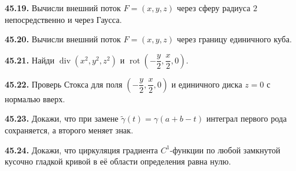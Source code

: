 \noindent\begin{minipage}[t]{\linewidth}\textbf{45.19.} Вычисли внешний поток \(F=(x,y,z)\) через сферу радиуса \(2\) непосредственно и через Гаусса.\par\end{minipage}\par
\noindent\begin{minipage}[t]{\linewidth}\textbf{45.20.} Вычисли внешний поток \(F=(x,y,z)\) через границу единичного куба.\par\end{minipage}\par
\noindent\begin{minipage}[t]{\linewidth}\textbf{45.21.} Найди \(\operatorname{div}(x^2,y^2,z^2)\) и \(\operatorname{rot}(-\dfrac y2,\dfrac x2,0)\).\par\end{minipage}\par
\noindent\begin{minipage}[t]{\linewidth}\textbf{45.22.}\starmark{} Проверь Стокса для поля \((-\dfrac y2,\dfrac x2,0)\) и единичного диска \(z=0\) с нормалью вверх.\par\end{minipage}\par
\noindent\begin{minipage}[t]{\linewidth}\textbf{45.23.}\starmark{} Докажи, что при замене \(\widetilde\gamma(t)=\gamma(a+b-t)\) интеграл первого рода сохраняется, а второго меняет знак.\par\end{minipage}\par
\noindent\begin{minipage}[t]{\linewidth}\textbf{45.24.}\starmark{} Докажи, что циркуляция градиента \(C^1\)-функции по любой замкнутой кусочно гладкой кривой в её области определения равна нулю.\par\end{minipage}\par
\endgroup
